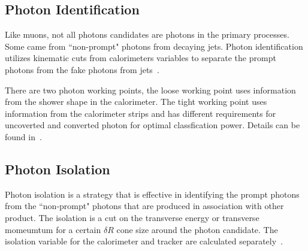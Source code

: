 \subsection{Photon Identification}
Like muons, not all photons candidates are photons in the primary processes. Some came from ``non-prompt" photons from decaying jets. Photon identification utilizes kinematic cuts from calorimeters variables to separate the prompt photons from the fake photons from jets~\cite{gammaCalibration2019}.

There are two photon working points, the loose working point uses information from the shower shape in the calorimeter. The tight working point uses information from the calorimeter strips and has different requirements for uncoverted and converted photon for optimal classfication power. Details can be found in~\cite{gammaCalibration2019}. 

\subsection{Photon Isolation}
Photon isolation is a strategy that is effective in identifying the prompt photons from the ``non-prompt" photons that are produced in association with other product. The isolation is a cut on the transverse energy or transverse momeumtum for a certain $\delta R $ cone size around the photon candidate. The isolation variable for the calorimeter and tracker are calculated separately~\cite{gammaCalibration2019}.

%
%


